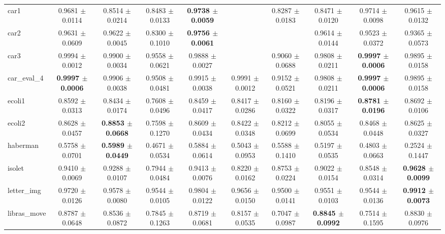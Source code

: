 \begin{table*}[htbp]
{\begin{tabular}{lccccccccc}
            car1 & 0.9681 $\pm$ 0.0114 & 0.8514 $\pm$ 0.0214 & 0.8483 $\pm$ 0.0133 & \cellcolor{graybg}\textbf{0.9738 $\pm$ 0.0059} &  & 0.8287 $\pm$ 0.0183 & 0.8471 $\pm$ 0.0120 & 0.9714 $\pm$ 0.0098 & 0.9615 $\pm$ 0.0132 \\ 
            car2 & 0.9631 $\pm$ 0.0609 & 0.9622 $\pm$ 0.0045 & 0.8300 $\pm$ 0.1010 & \cellcolor{graybg}\textbf{0.9756 $\pm$ 0.0061} &  &  & 0.9614 $\pm$ 0.0144 & 0.9523 $\pm$ 0.0372 & 0.9365 $\pm$ 0.0573 \\ 
            car3 & 0.9994 $\pm$ 0.0012 & 0.9900 $\pm$ 0.0034 & 0.9558 $\pm$ 0.0621 & 0.9888 $\pm$ 0.0027 &  & 0.9060 $\pm$ 0.0688 & 0.9808 $\pm$ 0.0211 & \cellcolor{graybg}\textbf{0.9997 $\pm$ 0.0006} & 0.9895 $\pm$ 0.0158 \\ 
            car\_eval\_4 & \cellcolor{graybg}\textbf{0.9997 $\pm$ 0.0006} & 0.9906 $\pm$ 0.0038 & 0.9508 $\pm$ 0.0481 & 0.9915 $\pm$ 0.0038 & 0.9991 $\pm$ 0.0012 & 0.9152 $\pm$ 0.0521 & 0.9808 $\pm$ 0.0211 & \cellcolor{graybg}\textbf{0.9997 $\pm$ 0.0006} & 0.9895 $\pm$ 0.0158 \\ 
            ecoli1 & 0.8592 $\pm$ 0.0313 & 0.8434 $\pm$ 0.0174 & 0.7608 $\pm$ 0.0496 & 0.8459 $\pm$ 0.0417 & 0.8417 $\pm$ 0.0286 & 0.8160 $\pm$ 0.0322 & 0.8196 $\pm$ 0.0317 & \cellcolor{graybg}\textbf{0.8781 $\pm$ 0.0196} & 0.8692 $\pm$ 0.0106 \\ 
            ecoli2 & 0.8628 $\pm$ 0.0457 & \cellcolor{graybg}\textbf{0.8853 $\pm$ 0.0668} & 0.7598 $\pm$ 0.1270 & 0.8609 $\pm$ 0.0434 & 0.8422 $\pm$ 0.0348 & 0.8212 $\pm$ 0.0699 & 0.8055 $\pm$ 0.0534 & 0.8468 $\pm$ 0.0448 & 0.8625 $\pm$ 0.0327 \\ 
            haberman & 0.5758 $\pm$ 0.0701 & \cellcolor{graybg}\textbf{0.5989 $\pm$ 0.0449} & 0.4671 $\pm$ 0.0534 & 0.5884 $\pm$ 0.0614 & 0.5043 $\pm$ 0.0953 & 0.5588 $\pm$ 0.1410 & 0.5197 $\pm$ 0.0535 & 0.4803 $\pm$ 0.0663 & 0.2524 $\pm$ 0.1447 \\ 
            isolet & 0.9410 $\pm$ 0.0069 & 0.9288 $\pm$ 0.0107 & 0.7944 $\pm$ 0.0484 & 0.9413 $\pm$ 0.0076 & 0.8220 $\pm$ 0.0162 & 0.8753 $\pm$ 0.0224 & 0.9022 $\pm$ 0.0154 & 0.8548 $\pm$ 0.0314 & \cellcolor{graybg}\textbf{0.9628 $\pm$ 0.0099} \\ 
            letter\_img & 0.9720 $\pm$ 0.0126 & 0.9578 $\pm$ 0.0080 & 0.9544 $\pm$ 0.0105 & 0.9804 $\pm$ 0.0122 & 0.9656 $\pm$ 0.0150 & 0.9500 $\pm$ 0.0141 & 0.9551 $\pm$ 0.0103 & 0.9544 $\pm$ 0.0136 & \cellcolor{graybg}\textbf{0.9912 $\pm$ 0.0073} \\ 
            libras\_move & 0.8787 $\pm$ 0.0648 & 0.8536 $\pm$ 0.0872 & 0.7845 $\pm$ 0.1263 & 0.8719 $\pm$ 0.0681 & 0.8157 $\pm$ 0.0535 & 0.7047 $\pm$ 0.0987 & \cellcolor{graybg}\textbf{0.8845 $\pm$ 0.0992} & 0.7514 $\pm$ 0.1595 & 0.8830 $\pm$ 0.0976 \\ 

\end{tabular}}
\end{table*}
